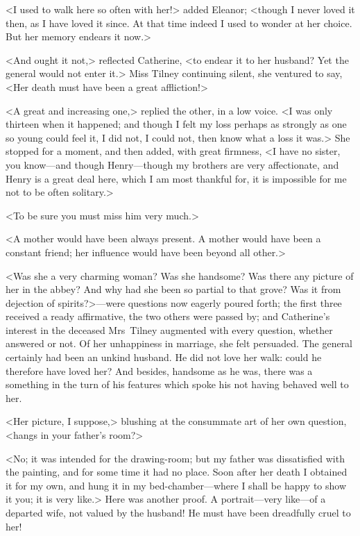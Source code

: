  <I used to walk here so often with her!> added Eleanor; <though I never loved it then, as I have loved it since. At that time indeed I used to wonder at her choice. But her memory endears it now.> 

 <And ought it not,> reflected Catherine, <to endear it to her husband? Yet the general would not enter it.> Miss Tilney continuing silent, she ventured to say, <Her death must have been a great affliction!> 

 <A great and increasing one,> replied the other, in a low voice. <I was only thirteen when it happened; and though I felt my loss perhaps as strongly as one so young could feel it, I did not, I could not, then know what a loss it was.> She stopped for a moment, and then added, with great firmness, <I have no sister, you know—and though Henry—though my brothers are very affectionate, and Henry is a great deal here, which I am most thankful for, it is impossible for me not to be often solitary.> 

 <To be sure you must miss him very much.> 

 <A mother would have been always present. A mother would have been a constant friend; her influence would have been beyond all other.> 

 <Was she a very charming woman? Was she handsome? Was there any picture of her in the abbey? And why had she been so partial to that grove? Was it from dejection of spirits?>—were questions now eagerly poured forth; the first three received a ready affirmative, the two others were passed by; and Catherine's interest in the deceased Mrs~Tilney augmented with every question, whether answered or not. Of her unhappiness in marriage, she felt persuaded. The general certainly had been an unkind husband. He did not love her walk: could he therefore have loved her? And besides, handsome as he was, there was a something in the turn of his features which spoke his not having behaved well to her. 

 <Her picture, I suppose,> blushing at the consummate art of her own question, <hangs in your father's room?> 

 <No; it was intended for the drawing-room; but my father was dissatisfied with the painting, and for some time it had no place. Soon after her death I obtained it for my own, and hung it in my bed-chamber—where I shall be happy to show it you; it is very like.> Here was another proof. A portrait—very like—of a departed wife, not valued by the husband! He must have been dreadfully cruel to her! 

